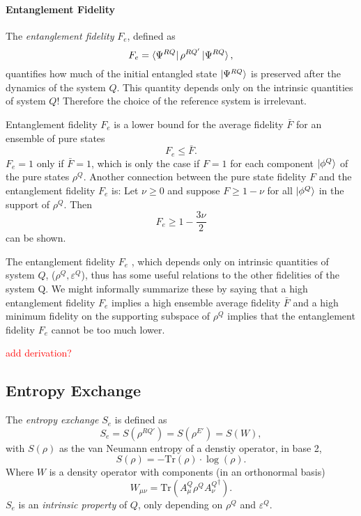 \paragraph{Entanglement Fidelity}
The \textit{entanglement fidelity} $F_e$, defined as 
\begin{equation}
    F_e = \bra{\Psi^{RQ}} \rho^{RQ'} \ket{\Psi^{RQ}},
\end{equation}
quantifies how much of the initial entangled state $\ket{\Psi^{RQ}}$ is preserved after the dynamics of the system $Q$.
This quantity depends only on the intrinsic quantities of system $Q$!
Therefore the choice of the reference system is irrelevant. \cite{qDataProcessing}

Entanglement fidelity $F_e$ is a lower bound for the average fidelity $\bar{F}$ for an ensemble of pure states
\begin{equation}
    F_e \le \bar{F}.
\end{equation}
$F_e=1$ only if $\bar{F}=1$, which is only the case if $F=1$ for each component $\ket{\phi^Q}$ of the pure states $\rho^Q$. 
Another connection between the pure state fidelity $F$ and the entanglement fidelity $F_e$ is:
Let $\nu \ge 0$ and suppose $F \ge 1-\nu$ for all $\ket{\phi^Q}$ in the support of $\rho^Q$.
Then 
\begin{equation}
    F_e \ge 1- \frac{3 \nu}{2}
\end{equation}
can be shown. \cite{qDataProcessing}

The entanglement fidelity $F_e$ , which depends only on intrinsic quantities of system $Q$,
($\rho^Q, \varepsilon^Q$), thus has some useful relations to the other fidelities of the system Q. 
We might informally summarize these by saying that a high entanglement fidelity $F_e$ 
implies a high ensemble average fidelity $\bar{F}$ 
and a high minimum fidelity on the supporting subspace of $\rho^Q$ implies that the entanglement fidelity $F_e$ cannot be too much lower. \cite{qDataProcessing}

\textcolor{red}{add derivation?}


\subsection{Entropy Exchange}
The \textit{entropy exchange} $S_e$ is defined as
\begin{equation}
    S_e = S(\rho^{RQ'}) = S(\rho^{E'}) = S(W),
\end{equation}
with $S(\rho)$ as the van Neumann entropy of a denstiy operator, in base 2,
\begin{equation}
    S(\rho)= - \text{Tr}(\rho)\cdot\log(\rho).
\end{equation}
Where $W$ is a density operator with components (in an orthonormal basis)
\begin{equation}
    W_{\mu\nu} = \text{Tr}(A_\mu^Q\rho^Q{A_\nu^Q}^\dagger).
\end{equation}
$S_e$ is an \textit{intrinsic property} of $Q$, only depending on $\rho^Q$ and $\varepsilon^Q$.


